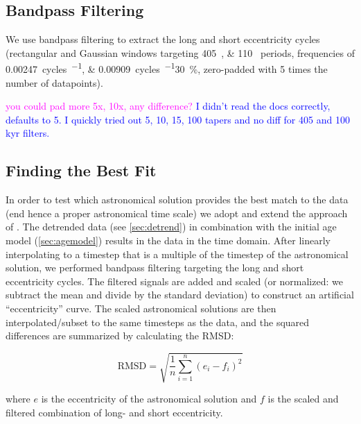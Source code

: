 \documentclass[draft]{agujournal2019}
\newcommand{\rez}{\textcolor{magenta}}
\newcommand{\ijk}{\textcolor{blue}}
\begin{document}
\subsection{Bandpass Filtering}\label{sec:spectral}


We use bandpass filtering to extract the long and short eccentricity cycles (rectangular and Gaussian windows targeting \qtylist{405;110}{\kiloyear} periods, frequencies of \qtylist{0.00247;0.00909}{cycles\per\kiloyear}\textpm\qty{30}{\percent}, zero-padded with 5 times the number of datapoints).

\rez{you could pad more 5x, 10x, any difference?}
\ijk{I didn't read the docs correctly, defaults to 5. I quickly tried out 5, 10, 15, 100 tapers and no diff for 405 and 100 kyr filters.}

\subsection{Finding the Best Fit}\label{sec:algorithm}

In order to test which astronomical solution provides the best match to the data (end hence a proper astronomical time scale) we adopt and extend the approach of .
The detrended data (see \cref{sec:detrend}) in combination with the initial age model (\cref{sec:agemodel}) results in the data in the time domain.
After linearly interpolating to a timestep that is a multiple of the timestep of the astronomical solution, we performed bandpass filtering targeting the long and short eccentricity cycles.
The filtered signals are added and scaled (or normalized: we subtract the mean and divide by the standard deviation) to construct an artificial ``eccentricity'' curve.
The scaled astronomical solutions are then interpolated/subset to the same timesteps as the data, and the squared differences are summarized by calculating the \gls{RMSD}:

\begin{equation}
    \text{RMSD} = \sqrt{\frac{1}{n}\sum_{i=1}^{n}(e_{i} - f_{i})^{2}}
\end{equation}

where \(e\) is the eccentricity of the astronomical solution and \(f\) is the scaled and filtered combination of long- and short eccentricity.
\end{document}
